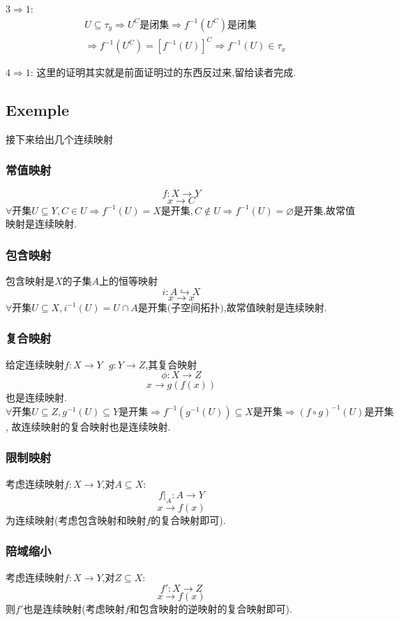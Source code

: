 \documentclass[12pt, a4paper, oneside]{ctexbook}
\begin{document}
  $3\Rightarrow 1$:
  $$
  \begin{aligned}&
    U\subseteq \tau_y\Rightarrow U^C\text{是闭集}\Rightarrow f^{-1}(U^C)\text{是闭集}\\&
    \Rightarrow f^{-1}(U^C)=[f^{-1}(U)]^C\Rightarrow f^{-1}(U)\in\tau_x
    \end{aligned}
  $$


  $4\Rightarrow 1$:
  这里的证明其实就是前面证明过的东西反过来,留给读者完成.
  \subsection{Exemple}
  接下来给出几个连续映射
  \subsubsection{常值映射}
  $$
    f:X\rightarrow  Y
  $$
  $$
    x\rightarrow C
  $$
  $\forall \text{开集}U\subseteq Y,C\in U\Rightarrow f^{-1}(U)=X \text{是开集}, 
  C\notin U\Rightarrow f^{-1}(U)=\varnothing \text{是开集}$,故常值映射是连续映射.
  \subsubsection{包含映射}
  包含映射是$X$的子集$A$上的恒等映射
  $$
    i:A\hookrightarrow  X
  $$
  $$
    x\rightarrow x
  $$
  $\forall \text{开集}U\subseteq X,i^{-1}(U)=U\cap A \text{是开集(子空间拓扑)}$,故常值映射是连续映射.
  \subsubsection{复合映射}
  给定连续映射$f:X\rightarrow  Y\text{    }g:Y\rightarrow  Z$,其复合映射
  $$
    \phi:X\rightarrow Z
  $$
  $$
    x\rightarrow g(f(x))
  $$
  也是连续映射.$\forall \text{开集}U\subseteq Z,g^{-1}(U)\subseteq Y 
  \text{是开集}\Rightarrow f^{-1}(g^{-1}(U))\subseteq X\text{是开集}\Rightarrow (f\circ g)^{-1}(U)\text{是开集}$,
  故连续映射的复合映射也是连续映射.
  \subsubsection{限制映射}
  考虑连续映射$f:X\rightarrow Y$,对$A\subseteq X:$
  $$
  f|_A:A\rightarrow Y
  $$
  $$
    x\rightarrow f(x)
  $$
  为连续映射(考虑包含映射和映射$f$的复合映射即可).
  \subsubsection{陪域缩小}
  考虑连续映射$f:X\rightarrow Y$,对$Z\subseteq X:$
  $$
    f': X\rightarrow Z
  $$
  $$
    x\rightarrow f(x)
  $$
  则$f'$也是连续映射(考虑映射$f$和包含映射的逆映射的复合映射即可).
\end{document}
